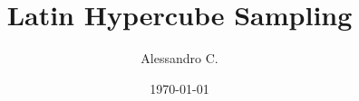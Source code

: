 \documentclass{article}
\begin{document}
\title{Latin Hypercube Sampling}
\author{Alessandro C.}
\date{\today}
\maketitle
\end{document}
